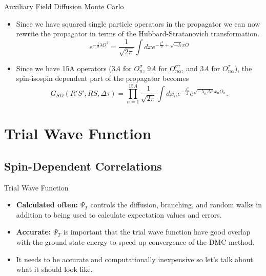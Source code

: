 \documentclass{beamer}
\newcommand{\dt}{\Delta\tau}
\begin{document}
\begin{frame}{Auxiliary Field Diffusion Monte Carlo}
\begin{itemize}
   \item Since we have squared single particle operators in the propagator we can now rewrite the propagator in terms of the Hubbard-Stratanovich transformation.
   \begin{equation*}
      e^{-\frac{1}{2}\lambda O^2} = \frac{1}{\sqrt{2\pi}} \int dx e^{-\frac{x^2}{2} + \sqrt{-\lambda}xO}
   \end{equation*}
   \item Since we have 15A operators ($3A$ for $O_{n}^{\sigma}$, $9A$ for $O_{n\alpha}^{\sigma\tau}$, and $3A$ for $O_{n\alpha}^{\tau}$), the spin-isospin dependent part of the propagator becomes
   \begin{equation*}
      G_{SD}(R'S',RS,\dt) = \prod\limits_{n=1}^{15A}\frac{1}{\sqrt{2\pi}}\int dx_n e^{-\frac{x_n^2}{2}}e^{\sqrt{-\lambda_n\dt} x_nO_n}.
   \end{equation*}
\end{itemize}
\end{frame}

\section{Trial Wave Function}
\subsection{Spin-Dependent Correlations}
\begin{frame}{Trial Wave Function}
\begin{itemize}
   \item \textbf{Calculated often:} $\Psi_T$ controls the diffusion, branching, and random walks in addition to being used to calculate expectation values and errors.
   \item \textbf{Accurate:} $\Psi_T$ is important that the trial wave function have good overlap with the ground state energy to speed up convergence of the DMC method.
   \item It needs to be accurate and computationally inexpensive so let's talk about what it should look like.
\end{itemize}
\end{frame}
\end{document}

